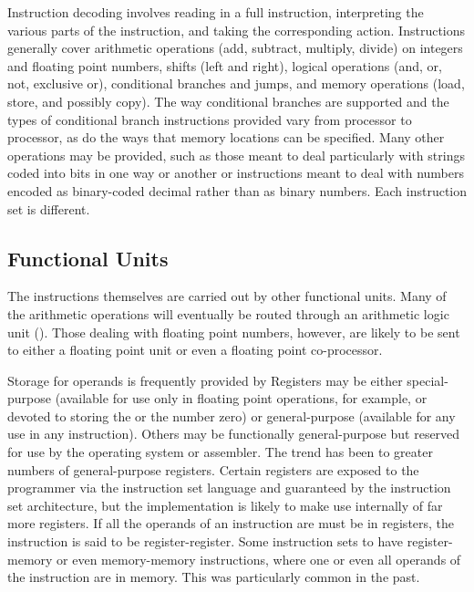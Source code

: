 Instruction decoding involves reading in a full instruction, interpreting the various parts of the instruction, and taking the corresponding action. Instructions generally cover arithmetic operations (add, subtract, multiply, divide) on integers and floating point numbers, shifts (left and right), logical operations (and, or, not, exclusive or), conditional branches and jumps, and memory operations (load, store, and possibly copy). The way conditional branches are supported and the types of conditional branch instructions provided vary from processor to processor, as do the ways that memory locations can be specified. Many other operations may be provided, such as those meant to deal particularly with strings coded into bits in one way or another or instructions meant to deal with numbers encoded as binary-coded decimal rather than as binary numbers. Each instruction set is different.

\subsection{Functional Units}
The instructions themselves are carried out by other functional units. Many of the arithmetic operations will eventually be routed through an arithmetic logic unit (). Those dealing with floating point numbers, however, are likely to be sent to either a floating point unit or even a floating point co-processor.

Storage for operands is frequently provided by  Registers may be either special-purpose (available for use only in floating point operations, for example, or devoted to storing the  or the number zero) or general-purpose (available for any use in any instruction). Others may be functionally general-purpose but reserved for use by the operating system or assembler. The trend has been to greater numbers of general-purpose registers. Certain registers are exposed to the programmer via the instruction set language and guaranteed by the instruction set architecture, but the implementation is likely to make use internally of far more registers. If all the operands of an instruction are must be in registers, the instruction is said to be register-register. Some instruction sets to have register-memory or even memory-memory instructions, where one or even all operands of the instruction are in memory. This was particularly common in the past.

